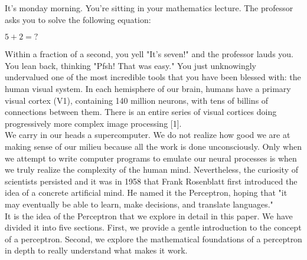 
	It's monday morning. You're sitting in your mathematics lecture. The professor asks you to solve the following equation:
	
	\begin{center}
		$5 + 2 = ?$
	\end{center}
	
	Within a fraction of a second, you yell "It's seven!" and the professor lauds you. You lean back, thinking "Pfsh! That was easy."   You just unknowingly undervalued one of the most incredible tools that you have been blessed with: the human visual system. In each hemisphere of our brain, humans have a primary visual cortex (V1), containing 140 million neurons, with tens of billins of connections between them. There is an entire series of visual cortices doing progressively more complex image processing [1]. \\
	
	We carry in our heads a supercomputer. We do not realize how good we are at making sense of our milieu because all the work is done unconsciously. Only when we attempt to write computer programs to emulate our neural processes is when we truly realize the complexity of the human mind. Nevertheless, the curiosity of scientists persisted and it was in 1958 that Frank Rosenblatt first introduced the idea of a concrete artificial mind. He named it the Perceptron, hoping that "it may eventually be able to learn, make decisions, and translate languages." \\
	
	It is the idea of the Perceptron that we explore in detail in this paper. We have divided it into five sections. First, we provide a gentle introduction to the concept of a perceptron. Second, we explore the mathematical foundations of a perceptron in depth to really understand what makes it work. 

